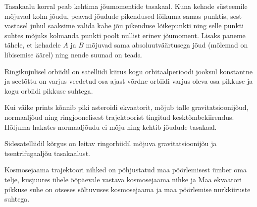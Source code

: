 \documentclass[10pt, twoside]{article}
\begin{document}
{%

\hint
Tasakaalu korral peab kehtima jõumomentide tasakaal. Kuna kehade süsteemile mõjuvad kolm jõudu, peavad jõudude pikendused lõikuma samas punktis, sest vastasel juhul saaksime valida kahe jõu pikenduse lõikepunkti ning selle punkti suhtes mõjuks kolmanda punkti poolt nullist erinev jõumoment. Lisaks paneme tähele, et kehadele $A$ ja $B$ mõjuvad sama absoluutväärtusega jõud (mõlemad on libisemise äärel) ning nende suunad on teada.
\probend
\bigskip


\hint
Ringikujulisel orbiidil on satelliidi kiirus kogu orbitaalperioodi jooksul konstantne ja seetõttu on varjus veedetud osa ajast võrdne orbiidi varjus oleva osa pikkuse ja kogu orbiidi pikkuse suhtega.
\probend
\bigskip


\hint
Kui väike prints kõnnib piki asteroidi ekvaatorit, mõjub talle gravitatsioonijõud, normaaljõud ning ringjoonelisest trajektoorist tingitud kesktõmbekiirendus. Hõljuma hakates normaaljõudu ei mõju ning kehtib jõudude tasakaal.
\probend
\bigskip


\hint
Sidesatelliidil kõrgus on leitav ringorbiidil mõjuva gravitatsioonijõu ja tsentrifugaaljõu tasakaalust.
\probend
\bigskip


\hint
Kosmosejaama trajektoori nihked on põhjustatud maa pöörlemisest ümber oma telje, kusjuures ühele ööpäevale vastava kosmosejaama nihke ja Maa ekvaatori pikkuse suhe on otseses sõltuvuses kosmosejaama ja maa pöörlemise nurkkiiruste suhtega.
\probend
\bigskip


}
\end{document}
